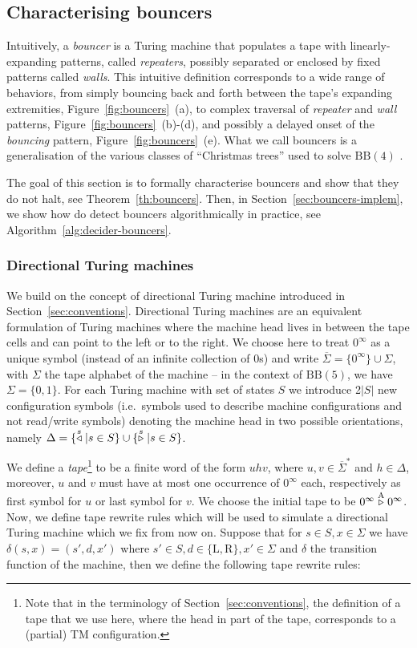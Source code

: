 \subsection{Characterising bouncers}

Intuitively, a \emph{bouncer} is a Turing machine that populates a tape with
linearly-expanding patterns, called \textit{repeaters}, possibly separated or enclosed by fixed patterns called \textit{walls}. This intuitive definition corresponds to a wide range of behaviors, from simply bouncing back and forth between the tape's expanding extremities, Figure~\ref{fig:bouncers}~(a), to complex traversal of \textit{repeater} and \textit{wall} patterns, Figure~\ref{fig:bouncers}~(b)-(d), and possibly a delayed onset of the \textit{bouncing} pattern, Figure~\ref{fig:bouncers}~(e). What we call bouncers is a generalisation of the various classes of ``Christmas trees'' used to solve $\text{BB}(4)$ \cite{Brady83}.

The goal of this section is to formally characterise bouncers and show that they do not halt, see Theorem~\ref{th:bouncers}. Then, in Section~\ref{sec:bouncers-implem}, we show how do detect bouncers algorithmically in practice, see Algorithm~\ref{alg:decider-bouncers}.

\subsubsection{Directional Turing machines}\label{sec:bouncers:directionalTM}

We build on the concept of directional Turing machine introduced in Section~\ref{sec:conventions}. Directional Turing machines are an equivalent formulation of Turing machines where the machine head lives in between the tape cells and can point to the left or to the right. We choose here to treat $0^\infty$ as a unique symbol (instead of an infinite collection of 0s) and write $\overline{\Sigma} = \{0^\infty\}\cup\Sigma$, with $\Sigma$ the tape alphabet of the machine -- in the context of $\text{BB}(5)$, we have $\Sigma=\{0,1\}$. For each Turing machine with set of states $S$ we introduce 2$|S|$ new configuration symbols (i.e.\ symbols used to describe machine configurations and not read/write symbols) denoting the machine head in two possible orientations, namely $\Delta = \{\stackrel{s}\triangleleft | s\in S\}\cup\{\stackrel{s}\triangleright| s \in S\}$.

We define a \textit{tape}\footnote{Note that in the terminology of Section~\ref{sec:conventions}, the definition of a tape that we use here, where the head in part of the tape, corresponds to a (partial) TM configuration.} to be a finite word of the form $uhv$, where $u,v\in \overline{\Sigma}^*$ and $h\in\Delta$, moreover, $u$ and $v$ must have at most one occurrence of $0^\infty$ each, respectively as first symbol for $u$ or last symbol for $v$. We choose the initial tape to be $0^\infty \stackrel{\text{A}}\triangleright 0^\infty$. Now, we define tape rewrite rules which will be used to simulate a directional Turing machine which we fix from now on. Suppose that for $s\in S, x\in \Sigma$ we have $\delta(s,x) = (s',d,x')$ where $s'\in S, d \in \{\text{L},\text{R}\}, x' \in \Sigma$ and $\delta$ the transition function of the machine, then we define the following tape rewrite rules:


